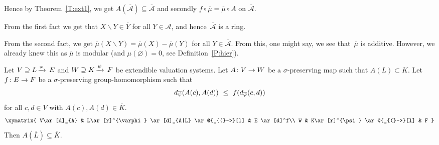 \documentclass[main.tex]{subfiles}
\begin{document}
\begin{ex}
Hence by Theorem~\ref{T:ext1},
we get $A(\overline{\mathcal{A}})\subseteq \overline{\mathcal{A}}$
and secondly
  $f\circ\overline\mu=\overline \mu \circ A$ on $\overline{\mathcal{A}}$.

From the first fact
we get that $X\backslash Y \in \overline{Y}$
for all $Y\in \mathcal{A}$,
and hence~$\overline{\mathcal{A}}$ is a ring.

From the second fact,
we get $\overline\mu (X\backslash Y)
= \overline\mu(X) - \overline\mu(Y)$
for all $Y\in \overline{\mathcal{A}}$.
From this,
one might say,
we see that~$\overline\mu$ is additive.
However, we already knew this
as $\overline\mu$ is modular
(and $\mu(\varnothing)=0$, see Definition~\ref{P:hier}).
\end{ex}
%
%
\begin{thm}
\label{T:ext2}
Let $V \supseteq L\,\smash{\xrightarrow{\varphi}\,E}$ and
 $W \supseteq K\,\smash{\xrightarrow{\psi}\,F}$ be extendible valuation systems.
Let
$A\colon V\rightarrow W$
be a $\sigma$-preserving map
such that $A(L)\subset K$.
Let $f\colon E\rightarrow F$ be a $\sigma$-preserving group-homomorphism
such that
\begin{equation}
\label{eq:T:ext2-as}
\ld{\overline{\psi}}(A(c),A(d))\ \leq\  f(\ld{\overline{\varphi}}(c,d))
\end{equation}
for all $c,d\in V$ with $A(c),A(d)\in \overline K$.
\begin{equation*}
\xymatrix{
V\ar[d]_{A} & 
  L\ar[r]^{\varphi} \ar[d]_{A|L} \ar @{_{(}->}[l] & 
  E \ar[d]^f\\
W &
  K\ar[r]^{\psi} \ar @{_{(}->}[l] & 
  F
}\end{equation*}
Then $A(\overline{L})\subseteq \overline{K}$.
\end{thm}
\end{document}
